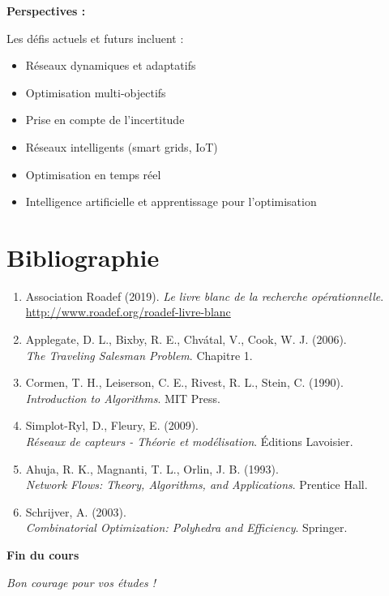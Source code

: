\documentclass[12pt,a4paper]{article}
\begin{document}
\begin{notecours}
\textbf{Perspectives :}

Les défis actuels et futurs incluent :
\begin{itemize}
    \item Réseaux dynamiques et adaptatifs
    \item Optimisation multi-objectifs
    \item Prise en compte de l'incertitude
    \item Réseaux intelligents (smart grids, IoT)
    \item Optimisation en temps réel
    \item Intelligence artificielle et apprentissage pour l'optimisation
\end{itemize}
\end{notecours}

\newpage
\section*{Bibliographie}

\begin{enumerate}
    \item Association Roadef (2019). \textit{Le livre blanc de la recherche opérationnelle}. \\
    \url{http://www.roadef.org/roadef-livre-blanc}
    
    \item Applegate, D. L., Bixby, R. E., Chvátal, V., Cook, W. J. (2006). \\
    \textit{The Traveling Salesman Problem}. Chapitre 1.
    
    \item Cormen, T. H., Leiserson, C. E., Rivest, R. L., Stein, C. (1990). \\
    \textit{Introduction to Algorithms}. MIT Press.
    
    \item Simplot-Ryl, D., Fleury, E. (2009). \\
    \textit{Réseaux de capteurs - Théorie et modélisation}. Éditions Lavoisier.
    
    \item Ahuja, R. K., Magnanti, T. L., Orlin, J. B. (1993). \\
    \textit{Network Flows: Theory, Algorithms, and Applications}. Prentice Hall.
    
    \item Schrijver, A. (2003). \\
    \textit{Combinatorial Optimization: Polyhedra and Efficiency}. Springer.
\end{enumerate}

\vspace{2em}

\begin{center}
\textcolor{titrebleu}{\Large\textbf{Fin du cours}}

\vspace{1em}

\textit{Bon courage pour vos études !}
\end{center}
\end{document}
